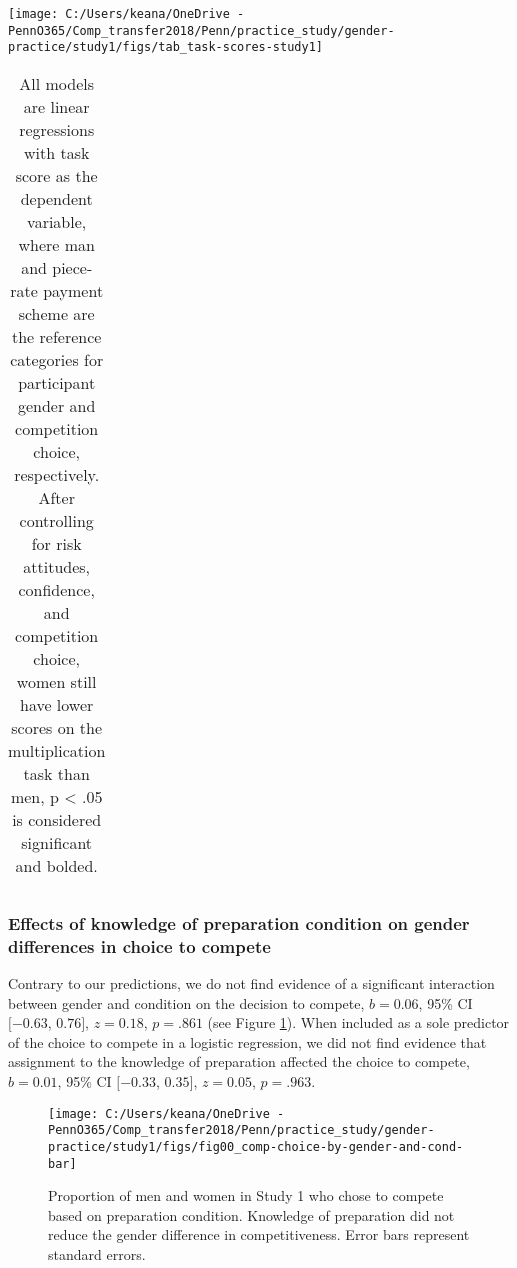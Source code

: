 \documentclass[letterpaper, nobind]{templates/ociamthesis}
\begin{document}
\begin{center}\texttt{[image: C:/Users/keana/OneDrive - PennO365/Comp\_transfer2018/Penn/practice\_study/gender-practice/study1/figs/tab\_task-scores-study1]} \end{center}

\begin{table}[ht]
\centering
\begingroup\fontsize{0.1pt}{0.1pt}\selectfont
\begin{tabular}{r}
   \\ 
 \end{tabular}
\endgroup
\caption{All models are linear regressions with task score as the dependent variable, where man and piece-rate payment scheme are the reference categories for participant gender and competition choice, respectively. After controlling for risk attitudes, confidence, and competition choice, women still have lower scores on the multiplication task than men, p < .05 is considered significant and bolded.} 
\label{tab:tab-task-scores-study1}
\end{table}

\hypertarget{effects-of-knowledge-of-preparation-condition-on-gender-differences-in-choice-to-compete}{%
\subsubsection{Effects of knowledge of preparation condition on gender differences in choice to compete}\label{effects-of-knowledge-of-preparation-condition-on-gender-differences-in-choice-to-compete}}

Contrary to our predictions, we do not find evidence of a significant interaction between gender and condition on the decision to compete, \(b = 0.06\), 95\% CI \([-0.63\), \(0.76]\), \(z = 0.18\), \(p = .861\) (see Figure \ref{fig:s100}). When included as a sole predictor of the choice to compete in a logistic regression, we did not find evidence that assignment to the knowledge of preparation affected the choice to compete, \(b = 0.01\), 95\% CI \([-0.33\), \(0.35]\), \(z = 0.05\), \(p = .963\).

\begin{figure}

{\centering \texttt{[image: C:/Users/keana/OneDrive - PennO365/Comp\_transfer2018/Penn/practice\_study/gender-practice/study1/figs/fig00\_comp-choice-by-gender-and-cond-bar]} 

}

\caption{Proportion of men and women in Study 1 who chose to compete based on preparation condition. Knowledge of preparation did not reduce the gender difference in competitiveness. Error bars represent standard errors.}\label{fig:s100}
\end{figure}
\end{document}
